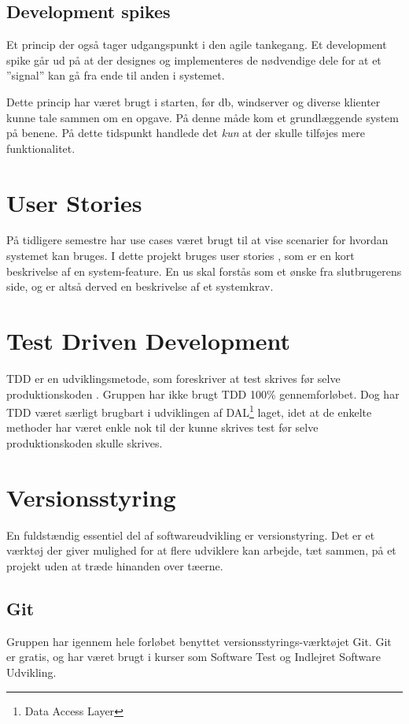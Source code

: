 \subsection{Development spikes}
Et princip der også tager udgangspunkt i den agile tankegang. Et development spike \cite{scaledagile} går ud på at der designes og implementeres de nødvendige dele for at et ''signal'' kan gå fra ende til anden i systemet.

Dette princip har været brugt i starten, før \gls{db}, \gls{windserver} og diverse klienter kunne tale sammen om en opgave. På denne måde kom et grundlæggende system på benene. På dette tidspunkt handlede det \textit{kun} at der skulle tilføjes mere funktionalitet.

\section{User Stories}
På tidligere semestre har use cases været brugt til at vise scenarier for hvordan systemet kan bruges. I dette projekt bruges user stories \cite{margaretrouse2015}, som er en kort beskrivelse af en system-feature. En \gls{us} skal forstås som et ønske fra slutbrugerens side, og er altså derved en beskrivelse af et systemkrav.


\section{Test Driven Development}
TDD er en udviklingsmetode, som foreskriver at test skrives før selve produktionskoden \cite{osherove2015art}. Gruppen har ikke brugt TDD 100\% gennemforløbet. 
Dog har TDD været særligt brugbart i udviklingen af DAL\footnote{Data Access Layer} laget, idet at de enkelte methoder har været enkle nok til der kunne skrives test før selve produktionskoden skulle skrives.

\section{Versionsstyring}
En fuldstændig essentiel del af softwareudvikling er versionstyring. Det er et værktøj der giver mulighed for at flere udviklere kan arbejde, tæt sammen, på et projekt uden at træde hinanden over tæerne.

\subsection{Git}
Gruppen har igennem hele forløbet benyttet versionsstyrings-værktøjet Git. Git er gratis, og har været brugt i kurser som Software Test og Indlejret Software Udvikling. 

